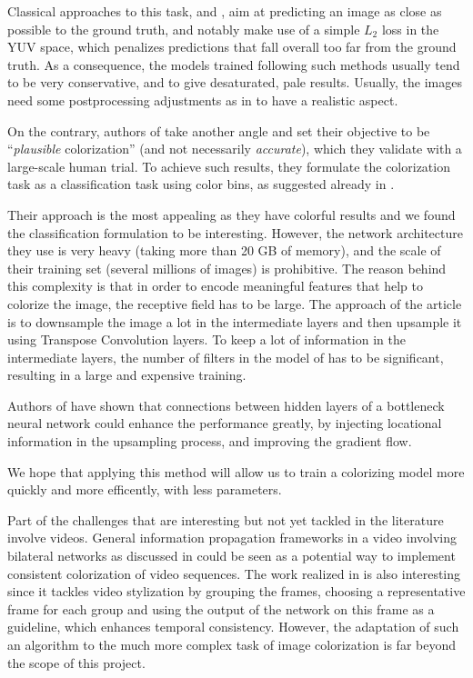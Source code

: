 \documentclass[10pt,twocolumn,letterpaper]{article}
\begin{document}
Classical approaches to this task, \eg \cite{cheng2015deep} and \cite{dahl2016tinyclouds}, aim at predicting an image as close as possible to the ground truth, and notably make use of a simple $L_2$ loss in the YUV space, which penalizes predictions that fall overall too far from the ground truth. As a consequence, the models trained following such methods usually tend to be very conservative, and to give desaturated, pale results. Usually, the images need some postprocessing adjustments as in \cite{deshpande2015learning} to have a realistic aspect.

On the contrary, authors of \cite{zhang2016colorful} take another angle and set their objective to be ``\textit{plausible} colorization'' (and not necessarily \textit{accurate}), which they validate with a large-scale human trial. To achieve such results, they formulate the colorization task as a classification task using color bins, as suggested already in \cite{charpiat2008automatic}.

Their approach is the most appealing as they have colorful results and we found the classification formulation to be interesting. However, the network architecture they use is very heavy (taking more than 20 GB of memory), and the scale of their training set (several millions of images) is prohibitive. The reason behind this complexity is that in order to encode meaningful features that help to colorize the image, the receptive field has to be large. The approach of the article is to downsample the image a lot in the intermediate layers and then upsample it using Transpose Convolution layers. To keep a lot of information in the intermediate layers, the number of filters in the model of \cite{zhang2016colorful} has to be significant, resulting in a large and expensive training.

Authors of \cite{ronneberger2015unet} have shown that connections between hidden layers of a bottleneck neural network could enhance the performance greatly, by injecting locational information in the upsampling process, and improving the gradient flow.

We hope that applying this method will allow us to train a colorizing model more quickly and more efficently, with less parameters.

Part of the challenges that are interesting but not yet tackled in the literature involve videos. General information propagation frameworks in a video involving bilateral networks as discussed in \cite{jampani2017video} could be seen as a potential way to implement consistent colorization of video sequences. The work realized in \cite{zhu2017video} is also interesting since it tackles video stylization by grouping the frames, choosing a representative frame for each group and using the output of the network on this frame as a guideline, which enhances temporal consistency. However, the adaptation of such an algorithm to the much more complex task of image colorization is far beyond the scope of this project.
\end{document}
